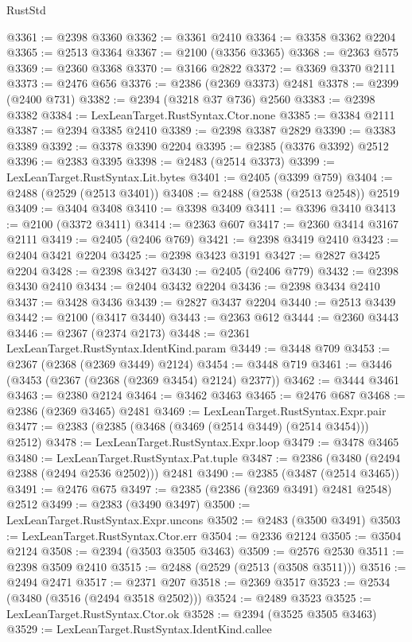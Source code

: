 \begin{lexlean}{RustStd}
\begin{coremodule}
@3361 := @2398 @3360
@3362 := @3361 @2410
@3364 := @3358 @3362 @2204
@3365 := @2513 @3364
@3367 := @2100 (@3356 @3365)
@3368 := @2363 @575
@3369 := @2360 @3368
@3370 := @3166 @2822
@3372 := @3369 @3370 @2111
@3373 := @2476 @656
@3376 := @2386 (@2369 @3373) @2481
@3378 := @2399 (@2400 @731)
@3382 := @2394 (@3218 @37 @736) @2560
@3383 := @2398 @3382
@3384 := LexLeanTarget.RustSyntax.Ctor.none
@3385 := @3384 @2111
@3387 := @2394 @3385 @2410
@3389 := @2398 @3387 @2829
@3390 := @3383 @3389
@3392 := @3378 @3390 @2204
@3395 := @2385 (@3376 @3392) @2512
@3396 := @2383 @3395
@3398 := @2483 (@2514 @3373)
@3399 := LexLeanTarget.RustSyntax.Lit.bytes
@3401 := @2405 (@3399 @759)
@3404 := @2488 (@2529 (@2513 @3401))
@3408 := @2488 (@2538 (@2513 @2548)) @2519
@3409 := @3404 @3408
@3410 := @3398 @3409
@3411 := @3396 @3410
@3413 := @2100 (@3372 @3411)
@3414 := @2363 @607
@3417 := @2360 @3414 @3167 @2111
@3419 := @2405 (@2406 @769)
@3421 := @2398 @3419 @2410
@3423 := @2404 @3421 @2204
@3425 := @2398 @3423 @3191
@3427 := @2827 @3425 @2204
@3428 := @2398 @3427
@3430 := @2405 (@2406 @779)
@3432 := @2398 @3430 @2410
@3434 := @2404 @3432 @2204
@3436 := @2398 @3434 @2410
@3437 := @3428 @3436
@3439 := @2827 @3437 @2204
@3440 := @2513 @3439
@3442 := @2100 (@3417 @3440)
@3443 := @2363 @612
@3444 := @2360 @3443
@3446 := @2367 (@2374 @2173)
@3448 := @2361 LexLeanTarget.RustSyntax.IdentKind.param
@3449 := @3448 @709
@3453 := @2367 (@2368 (@2369 @3449) @2124)
@3454 := @3448 @719
@3461 := @3446 (@3453 (@2367 (@2368 (@2369 @3454) @2124) @2377))
@3462 := @3444 @3461
@3463 := @2380 @2124
@3464 := @3462 @3463
@3465 := @2476 @687
@3468 := @2386 (@2369 @3465) @2481
@3469 := LexLeanTarget.RustSyntax.Expr.pair
@3477 := @2383 (@2385 (@3468 (@3469 (@2514 @3449) (@2514 @3454))) @2512)
@3478 := LexLeanTarget.RustSyntax.Expr.loop
@3479 := @3478 @3465
@3480 := LexLeanTarget.RustSyntax.Pat.tuple
@3487 := @2386 (@3480 (@2494 @2388 (@2494 @2536 @2502))) @2481
@3490 := @2385 (@3487 (@2514 @3465))
@3491 := @2476 @675
@3497 := @2385 (@2386 (@2369 @3491) @2481 @2548) @2512
@3499 := @2383 (@3490 @3497)
@3500 := LexLeanTarget.RustSyntax.Expr.uncons
@3502 := @2483 (@3500 @3491)
@3503 := LexLeanTarget.RustSyntax.Ctor.err
@3504 := @2336 @2124
@3505 := @3504 @2124
@3508 := @2394 (@3503 @3505 @3463)
@3509 := @2576 @2530
@3511 := @2398 @3509 @2410
@3515 := @2488 (@2529 (@2513 (@3508 @3511)))
@3516 := @2494 @2471
@3517 := @2371 @207
@3518 := @2369 @3517
@3523 := @2534 (@3480 (@3516 (@2494 @3518 @2502)))
@3524 := @2489 @3523
@3525 := LexLeanTarget.RustSyntax.Ctor.ok
@3528 := @2394 (@3525 @3505 @3463)
@3529 := LexLeanTarget.RustSyntax.IdentKind.callee

\end{coremodule}
\end{lexlean}
